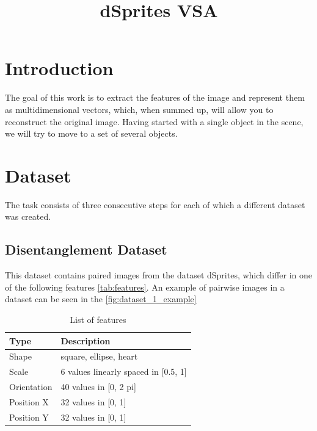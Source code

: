 \documentclass{article}
\title{dSprites VSA}
\author{ }
\date{ }
\begin{document}
    \maketitle


    \section{Introduction}

    The goal of this work is to extract the features of the image
    and represent them as multidimensional vectors, which, when
    summed up, will allow you to reconstruct the original image.
    Having started with a single object in the scene, we will try
    to move to a set of several objects.


    \section{Dataset}

    The task consists of three consecutive steps for each of
    which a different dataset was created.

    \subsection{Disentanglement Dataset}

    This dataset contains paired images from the dataset
    dSprites, which differ in one of the following features \autoref{tab:features}.
    An example of pairwise images in a dataset can be seen in the \autoref{fig:dataset_1_example}

    \begin{table}[ht]
        \centering
        \caption{List of features}
        \label{tab:features}
        \begin{tabular}[t]{ll}
            \hline
            Type        & Description                          \\
            \hline
            Shape       & square, ellipse, heart               \\
            Scale       & 6 values linearly spaced in [0.5, 1] \\
            Orientation & 40 values in [0, 2 pi]               \\
            Position X  & 32 values in [0, 1]                  \\
            Position Y  & 32 values in [0, 1]                  \\
            \hline
        \end{tabular}
    \end{table}
\end{document}
